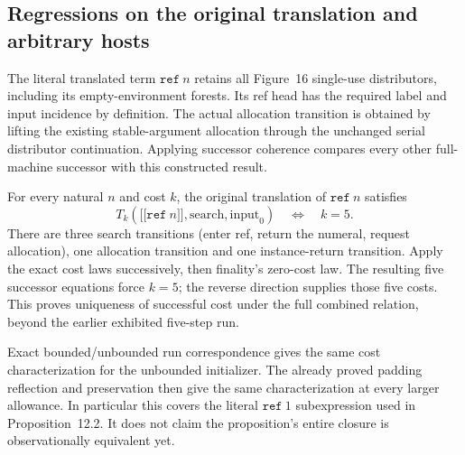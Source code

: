 


\subsection{Regressions on the original translation and arbitrary hosts}

The literal translated term $\mathtt{ref}\ n$ retains all Figure~16
single-use distributors, including its empty-environment forests. Its ref
head has the required label and input incidence by definition. The actual
allocation transition is obtained by lifting the existing stable-argument
allocation through the unchanged serial distributor continuation. Applying
successor coherence compares every other full-machine successor with this
constructed result.




For every natural $n$ and cost $k$, the original translation of
$\mathtt{ref}\ n$ satisfies
\[
 T_k(\lbrack\!\lbrack\mathtt{ref}\ n\rbrack\!\rbrack,\mathrm{search},\mathrm{input}_0)
 \quad\Longleftrightarrow\quad k=5.
\]
There are three search transitions (enter ref, return the numeral, request
allocation), one allocation transition and one instance-return transition.
Apply the exact cost laws successively, then finality's zero-cost law. The
resulting five successor equations force $k=5$; the reverse direction supplies
those five costs. This proves uniqueness of successful cost under the full
combined relation, beyond the earlier exhibited five-step run.


Exact bounded/unbounded run correspondence gives the same cost characterization
for the unbounded initializer. The already proved padding reflection and
preservation then give the same characterization at every larger allowance.
In particular this covers the literal $\mathtt{ref}\ 1$ subexpression used
in Proposition~12.2. It does not claim the proposition's entire closure is
observationally equivalent yet.

